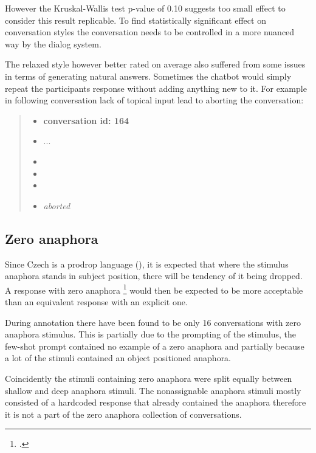 However the Kruskal-Wallis test p-value of 0.10 suggests too small effect
to consider this result replicable.
To find statistically significant effect on conversation styles
the conversation needs to be controlled in a more nuanced way by the dialog system.

The relaxed style however better rated on average also suffered from some issues
in terms of generating natural answers.
Sometimes the chatbot would simply repeat the participants response without adding anything new to it.
For example in following conversation lack of topical input lead to aborting the conversation:

\begin{quote}
\begin{itemize}[label={}, leftmargin=0pt, itemsep=0.5em]
\item \textbf{conversation id: 164}
\item ...
\item {}
\item {}
\item {}
\item \textit{aborted}
\end{itemize}
\end{quote}


\subsection{Zero anaphora}

Since Czech is a prodrop language (),
it is expected that where the stimulus anaphora stands in subject position,
there will be tendency of it being dropped.
A response with zero anaphora \footcite{zero} would then be expected to be more acceptable
than an equivalent response with an explicit one.

During annotation there have been found to be only 16 conversations with zero anaphora stimulus.
This is partially due to the prompting of the stimulus,
the few-shot prompt contained no example of a zero anaphora and
partially because a lot of the stimuli contained an object positioned anaphora.

Coincidently the stimuli containing zero anaphora were split equally between shallow and deep anaphora stimuli.
The nonassignable anaphora stimuli mostly consisted of a hardcoded response that already contained the anaphora
therefore it is not a part of the zero anaphora collection of conversations.

